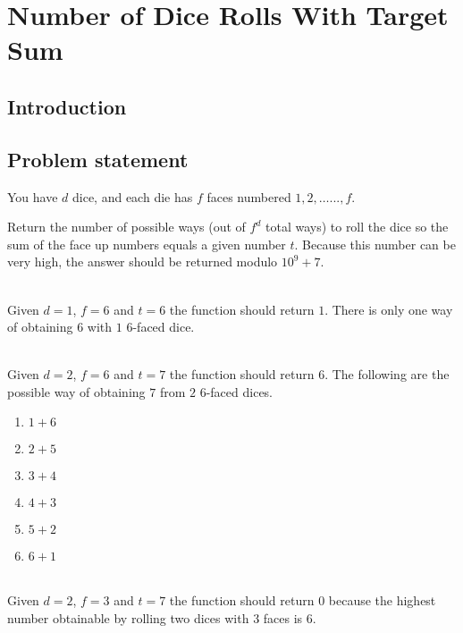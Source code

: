 %

\chapter{Number of Dice Rolls With Target Sum}
\label{ch:dice_rolls}
\section*{Introduction}

\section{Problem statement}
\begin{exercise}
You have $d$ dice, and each die has $f$ faces numbered $1, 2, \ldots..., f$.

Return the number of possible ways (out of $f^d$ total ways) to roll the dice so the sum of the face up numbers equals a given number $t$. Because this number can be very high, the answer should be returned modulo $10^9 + 7$.

	\begin{example}
		\hfill \\
		Given $d=1$, $f=6$ and $t=6$ the function should return $1$. There is only one way of obtaining $6$ with $1$ $6$-faced dice.
	\end{example}

	\begin{example}
		\hfill \\
		Given $d=2$, $f=6$ and $t=7$ the function should return $6$. The following are the possible way of obtaining $7$ from $2$ $6$-faced dices.
		\begin{enumerate}
			\item $1+6$
			\item $2+5$
			\item $3+4$
			\item $4+3$
			\item $5+2$
			\item $6+1$
		\end{enumerate}
		
	\end{example}

	\begin{example}
		\hfill \\
		Given $d=2$, $f=3$ and $t=7$ the function should return $0$ because the highest number obtainable by rolling two dices with $3$ faces is $6$.
	\end{example}
\end{exercise}

